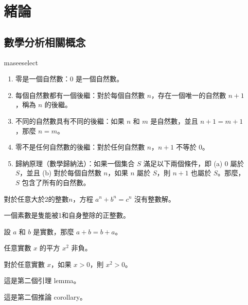 \documentclass[writingLanguage=chinese,
    addPageTitle=on,
    addDeclaration=on,
    addMUSTlog=off,
    addFigTOC=on,   
    addTabTOC=on,
    refIndent=off,
    printMod=off,
]{.def/must}
\def\Name               {李永建}%
\begin{document}
 

\ifthenelse{\equal{\Name}{模板}}{\addinfo}{}

\chapter{緒論}
\section{數學分析相關概念}

\begin{axiom}[皮亞諾公理 1]
maseeselect
\begin{enumerate}[label=\Alph*.]
\item 零是一個自然數：$0$ 是一個自然數。
\item 每個自然數都有一個後繼：對於每個自然數 $n$，存在一個唯一的自然數 $n+1$，稱為 $n$ 的後繼。
\item 不同的自然數具有不同的後繼：如果 $n$ 和 $m$ 是自然數，並且 $n+1 = m+1$，那麼 $n = m$。
\item 零不是任何自然數的後繼：對於任何自然數 $n$，$n+1$ 不等於 $0$。
\item 歸納原理（數學歸納法）：如果一個集合 $S$ 滿足以下兩個條件，即 (a) $0$ 屬於 $S$，並且 (b) 對於每個自然數 $n$，如果 $n$ 屬於 $S$，則 $n+1$ 也屬於 $S$。那麼，$S$ 包含了所有的自然數。
\end{enumerate}
\end{axiom}

\begin{theorem}[費馬定理]
對於任意大於2的整數$n$，方程 $a^n + b^n = c^n$ 沒有整數解。
\end{theorem}



\begin{definition}
    一個素數是隻能被1和自身整除的正整數。
\end{definition}
\begin{example}
    設 $a$ 和 $b$ 是實數，那麼 $a+b=b+a$。
\end{example}

\begin{property}
    任意實數 $x$ 的平方 $x^2$ 非負。
\end{property}
\begin{proposition}
    對於任意實數 $x$，如果 $x > 0$，則 $x^2 > 0$。
\end{proposition}
\begin{lemma}
這是第二個引理 lemma。
\end{lemma}

\begin{corollary}
這是第二個推論 corollary。
\end{corollary}
\end{document}
